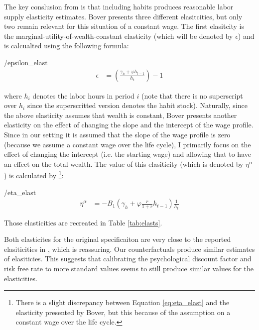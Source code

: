 \documentclass[ProjectMMD]{subfiles}
\begin{document}
The key conslusion from \cite{bover1991relaxing} is that including habits produces reasonable labor supply elasticity estimates. Bover presents three different elasitcities, but only two remain relevant for this situation of a constant wage. The first elasitcity is the marginal-utility-of-wealth-constant elasticity (which will be denoted by $\epsilon$) and is calcualted using the following formula:
\begin{verbatimwrite}{\EqDir/epsilon_elast}
  \begin{align}
    \epsilon &= \left( \frac{\gamma_h + \varphi h_{t-1}}{h_t} \right) -1 \label{eq:epsilon_elast}
  \end{align}
\end{verbatimwrite}

where $h_i$ denotes the labor hours in period $i$ (note that there is no superscript over $h_i$ since the superscritted version denotes the habit stock). Naturally, since the above elasticity assumes that wealth is constant, Bover presents another elasticity on the effect of changing the slope and the intercept of the wage profile. Since in our setting it is  assumed that the slope of the wage profile is zero (because we assume a constant wage over the life cycle), I primarily focus on the effect of changing the intercept (i.e. the starting wage) and allowing that to have an effect on the total wealth. The value of this elasiticity (which is denoted by $\eta^\alpha$) is calculated by \footnote{There is a slight discrepancy between Equation \eqref{eq:eta_elast} and the elasticity presented by Bover, but this because of the assumption on a constant wage over the life cycle.}:
\begin{verbatimwrite}{\EqDir/eta_elast}
  \begin{align}
\eta^\alpha &= -B_1 \left(\gamma_h + \varphi \frac{r}{1+r}h_{t-1} \right)\frac{1}{h_t} \label{eq:eta_elast}
  \end{align}
\end{verbatimwrite}


    Those elasticities are recreated in Table \ref{tab:elasts}. 

Both elasticites for the original specificaiton are very close to the reported elasiticities in \cite{bover1991relaxing}, which is reassuring. Our counterfactuals produce similar estimates of elasiticies. This suggests that calibrating the psychological discount factor and risk free rate to more standard values seems to still produce similar values for the elasticities. 
\end{document}
